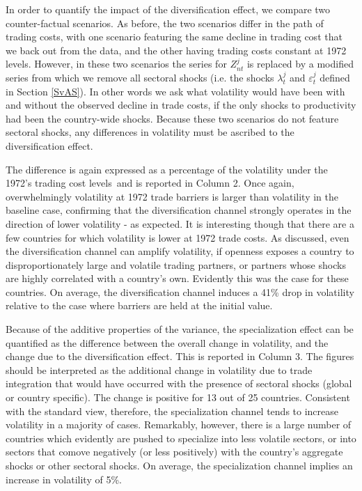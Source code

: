 \documentclass[12pt]{article}
\begin{document}
In order to quantify the impact of the diversification effect, we compare
two counter-factual scenarios. As before, the two scenarios differ in the
path of trading costs, with one scenario featuring the same decline in
trading cost that we back out from the data, and the other having trading
costs constant at 1972 levels. However, in these two scenarios the series
for $Z_{nt}^{j}$ is replaced by a modified series from which we remove all
sectoral shocks (i.e. the shocks $\lambda _{t}^{j}$ and $\varepsilon
_{t}^{j} $ defined in Section \ref{SvAS}). In other words we ask what
volatility would have been with and without the observed decline in trade
costs, if the only shocks to productivity had been the country-wide shocks.
Because these two scenarios do not feature sectoral shocks, any differences
in volatility must be ascribed to the diversification effect.

The difference is again expressed as a percentage of the volatility under
the 1972's trading cost levels\ and is reported in Column 2. Once again,
overwhelmingly volatility at 1972 trade barriers is larger than volatility
in the baseline case, confirming that the diversification channel strongly
operates in the direction of lower volatility - as expected. It is
interesting though that there are a few countries for which volatility is
lower at 1972 trade costs. As discussed, even the diversification channel
can amplify volatility, if openness exposes a country to disproportionately
large and volatile trading partners, or partners whose shocks are highly
correlated with a country's own. Evidently this was the case for these
countries. On average, the diversification channel induces a 41\% drop in
volatility relative to the case where barriers are held at the initial value.

Because of the additive properties of the variance, the specialization
effect can be quantified as the difference between the overall change in
volatility, and the change due to the diversification effect. This is
reported in Column 3. The figures should be interpreted as the additional change in
volatility due to trade integration that would have occurred with the presence of
sectoral shocks (global or country specific). The change is
positive for 13 out of 25 countries. Consistent with the standard view,
therefore, the specialization channel tends to increase volatility in a
majority of cases. Remarkably, however, there is a large number of countries
which evidently are pushed to specialize into less volatile sectors, or into
sectors that comove negatively (or less positively) with the country's
aggregate shocks or other sectoral shocks. On average, the specialization
channel implies an increase in volatility of 5\%.
\end{document}
